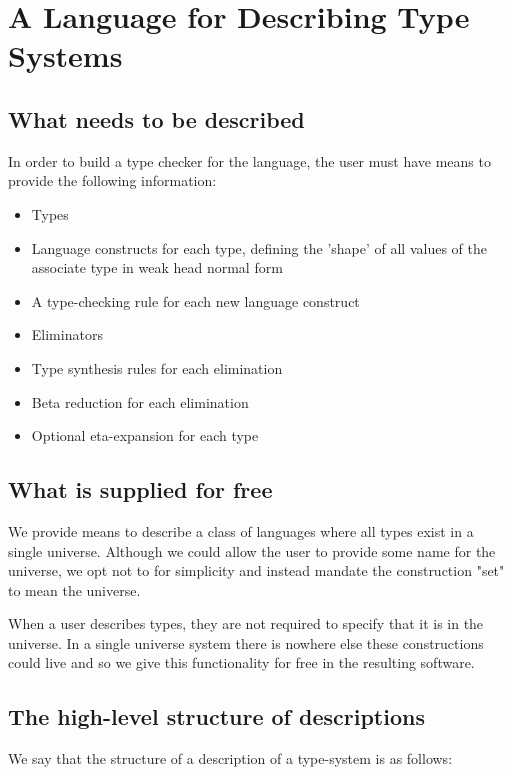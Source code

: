 \chapter{A Language for Describing Type Systems}
\label{chapter-DSL}


\section{What needs to be described}

In order to build a type checker for the language, the user must have
means to provide the following information:

\begin{itemize}
  \item Types
  \item Language constructs for each type, defining the 'shape' of
    all values of the associate type in weak head normal form
  \item A type-checking rule for each new language construct
  \item Eliminators
  \item Type synthesis rules for each elimination
  \item Beta reduction for each elimination
  \item Optional eta-expansion for each type
\end{itemize}

\section{What is supplied for free}

We provide means to describe a class of languages where all types
exist in a single universe. Although we could allow the user to
provide some name for the universe, we opt not to for simplicity and
instead mandate the construction "set" to mean the universe.

When a user describes types, they are not required to specify that it
is in the universe. In a single universe system there is nowhere else
these constructions could live and so we give this functionality for
free in the resulting software.

\section{The high-level structure of descriptions}

We say that the structure of a description of a type-system is as
follows: 

